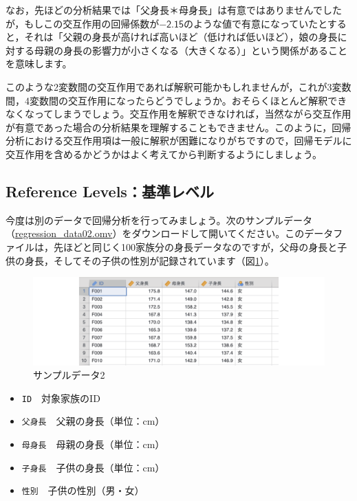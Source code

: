 \documentclass[
  12pt,
  a5jpaper,
  lualatex, ja=standard]{bxjsbook}
\providecommand{\tightlist}{%
  \setlength{\itemsep}{0pt}\setlength{\parskip}{0pt}}
\newenvironment{jmvvar}{%
	\begin{center}%
	\begin{tcolorbox}[%
		title=変数一覧,
		colframe=daidai,
		colbacktitle=daidai!30!white,
		coltitle=daidai!10!black,
		colback=daidai!2!white,
		breakable,
		width=.9\textwidth
		]\small\addtolength{\leftmargini}{-3\labelsep}%
	}%
	{\end{tcolorbox}\end{center}}
\begin{document}
なお，先ほどの分析結果では「父身長＊母身長」は有意ではありませんでしたが，もしこの交互作用の回帰係数が\(-\textsf{2.15}\)のような値で有意になっていたとすると，それは「父親の身長が高ければ高いほど（低ければ低いほど），娘の身長に対する母親の身長の影響力が小さくなる（大きくなる）」という関係があることを意味します。

このような2変数間の交互作用であれば解釈可能かもしれませんが，これが3変数間，4変数間の交互作用になったらどうでしょうか。おそらくほとんど解釈できなくなってしまうでしょう。交互作用を解釈できなければ，当然ながら交互作用が有意であった場合の分析結果を理解することもできません。このように，回帰分析における交互作用項は一般に解釈が困難になりがちですので，回帰モデルに交互作用を含めるかどうかはよく考えてから判断するようにしましょう。

\hypertarget{sub:regression-LR-reflevels}{%
\subsection{Reference Levels：基準レベル}\label{sub:regression-LR-reflevels}}

今度は別のデータで回帰分析を行ってみましょう。次のサンプルデータ（\href{https://github.com/sbtseiji/jmv_compguide/raw/main/data/omv/regression_data02.omv}{regression\_data02.omv}）をダウンロードして開いてください。このデータファイルは，先ほどと同じく100家族分の身長データなのですが，父母の身長と子供の身長，そしてその子供の性別が記録されています（図\ref{fig:regression-data02}）。

\begin{figure}[!ht]

{\centering \includegraphics[width=1\linewidth]{images/regression/data02} 

}

\caption{サンプルデータ2}\label{fig:regression-data02}
\end{figure}

\begin{jmvvar}

\begin{itemize}
\tightlist
\item
  \texttt{ID}　対象家族のID
\item
  \texttt{父身長}　父親の身長（単位：cm）
\item
  \texttt{母身長}　母親の身長（単位：cm）
\item
  \texttt{子身長}　子供の身長（単位：cm）
\item
  \texttt{性別}　子供の性別（男・女）
\end{itemize}

\end{jmvvar}
\end{document}
